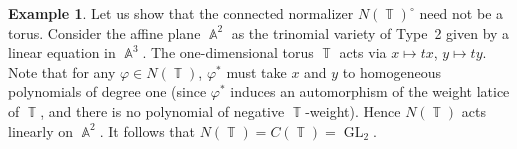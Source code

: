 \documentclass[a4paper,reqno,12pt]{amsart}
\theoremstyle{theorem}
\theoremstyle{definition}
\newtheorem{example}[theorem]{Example}
\theoremstyle{theorem}
\theoremstyle{remark}
\DeclareMathOperator{\GL}{GL}
\DeclareMathOperator{\A}{\mathbb A}
\DeclareMathOperator{\TT}{\mathbb T}
\newcommand{\lmt}{\longmapsto}
\newcommand{\0}{\circ}
\begin{document}
\begin{example}
    Let us show that the connected normalizer $N(\TT)^\0$ need not be a torus. Consider the affine plane $\A^2$ as the trinomial variety of Type~2 given by a linear equation in $\A^3$. The one-dimensional torus $\TT$ acts via $x\lmt tx$, $y\lmt ty$. Note that for any $\varphi\in N(\TT)$, $\varphi^*$ must take $x$ and $y$ to homogeneous polynomials of degree one (since $\varphi^*$ induces an automorphism of the weight latice of $\TT$, and there is no polynomial of negative $\TT$-weight).   
   Hence $N(\TT)$ acts linearly on $\A^2$. It follows that $N(\TT)=C(\TT)=\GL_2$.
\end{example}
\end{document}
